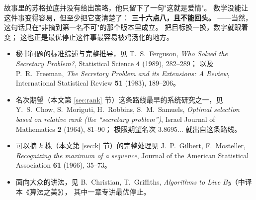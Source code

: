 \documentclass[UTF8,11pt,fontset=macnew]{ctexart}
\begin{document}
故事里的苏格拉底并没有给出策略，他只留下了一句"这就是爱情"。
数学没能让这件事变得容易，但至少把它变清楚了：
\textbf{三十六点八，且不能回头。}
——当然，这句话只在"非摘到第一名不可"的那个版本里成立。
把目标换一换，数字就跟着变；
这也正是最优停止这件事最容易被鸡汤化的地方。

\begin{keybox}[参考]
\begin{itemize}
  \item 秘书问题的标准综述与完整推导，见
        T.~S.~Ferguson, \textit{Who Solved the Secretary Problem?},
        Statistical Science \textbf{4} (1989), 282--289；
        以及 P.~R.~Freeman, \textit{The Secretary Problem and its Extensions:
        A Review}, International Statistical Review \textbf{51} (1983), 189--206。
  \item 名次期望（本文第 \ref{sec:rank} 节）这条路线最早的系统研究之一，见
        Y.~S.~Chow, S.~Moriguti, H.~Robbins, S.~M.~Samuels,
        \textit{Optimal selection based on relative rank
        (the ``secretary problem'')}, Israel Journal of Mathematics
        \textbf{2} (1964), 81--90；
        极限期望名次 $3.8695\ldots$ 就出自这条路线。
  \item 可以摘 $k$ 株（本文第 \ref{sec:k} 节）的完整处理见
        J.~P.~Gilbert, F.~Mosteller, \textit{Recognizing the maximum of a
        sequence}, Journal of the American Statistical Association
        \textbf{61} (1966), 35--73。
  \item 面向大众的讲法，见 B.~Christian, T.~Griffiths,
        \textit{Algorithms to Live By}（中译本《算法之美》），
        其中一章专讲最优停止。
\end{itemize}
\end{keybox}
\end{document}
